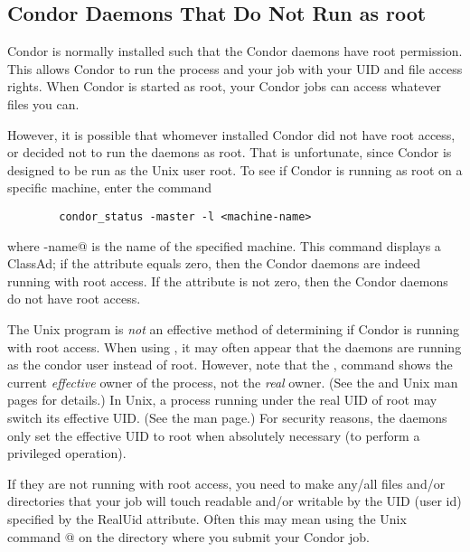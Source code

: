 \subsection{Condor Daemons That Do Not Run as root}

Condor is normally installed such that the Condor daemons have root
permission.
This allows Condor to run the  
process and
your job with your UID and file access rights.
When Condor
is started as root, your Condor jobs can access whatever files you can.

However, it is possible that whomever installed Condor 
did not have root access, or
decided not to run the daemons as root.
That is unfortunate,
since Condor is designed to be run as the Unix user root.
To see if Condor is
running as root on a specific machine, enter the command
\begin{verbatim}
        condor_status -master -l <machine-name>
\end{verbatim}

where \verb@machine-name@ is the name of the specified machine.
This command displays a  ClassAd; if the
attribute  equals zero,
then the Condor daemons are indeed
running with root access.  If the
 attribute is not zero, then the Condor daemons do not have
root access.

\Note The Unix program 
is \emph{not} an effective
method of determining if Condor is running with root access.
When using ,
it may often appear that the daemons are
running as the condor user instead of root.
However, note that the ,
command shows the current \emph{effective} owner of the
process, not the \emph{real} owner.  (See the  and
 Unix man pages for details.)  In Unix, a process
running under the real UID of root may switch its effective UID.
(See the  man page.)
For security reasons, the daemons
only set the effective UID to root when absolutely necessary
(to perform a privileged operation).

If they are not running with root access, you need to make any/all files
and/or directories that your job will touch readable and/or writable by
the UID (user id) specified by the RealUid attribute.
Often this may
mean using the Unix command @
on the directory where you submit your Condor job.

